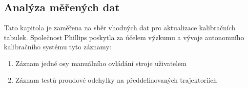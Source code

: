 \subsection{Analýza měřených dat}
Tato kapitola je zaměřena na sběr vhodných dat pro aktualizace kalibračních tabulek. Společnost Phillips poskytla za účelem výzkumu a vývoje autonomního kalibračního systému tyto záznamy:
\begin{enumerate}
    \item\label{item:analýza soubor jedna osa} Záznam jedné osy manuálního ovládání stroje uživatelem
    \item\label{item:analýza soubor test proudu} Záznam testů proudové odchylky na předdefinovaných trajektoriích
\end{enumerate}
